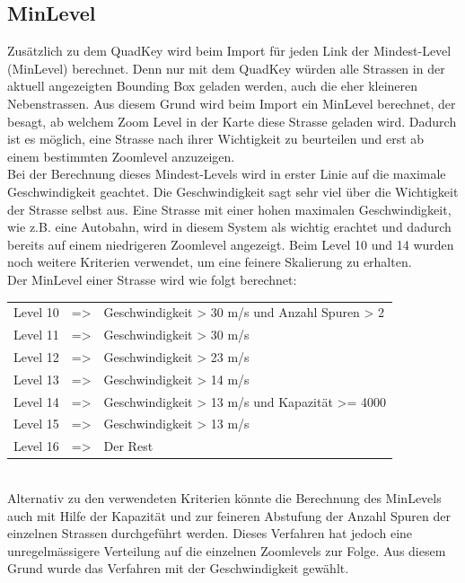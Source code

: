 \subsection{MinLevel}
Zusätzlich zu dem QuadKey wird beim Import für jeden Link der Mindest-Level (MinLevel) berechnet. Denn nur mit dem QuadKey würden alle Strassen in der aktuell angezeigten Bounding Box geladen werden, auch die eher kleineren Nebenstrassen. Aus diesem Grund wird beim Import ein MinLevel berechnet, der besagt, ab welchem Zoom Level in der Karte diese Strasse geladen wird. Dadurch ist es möglich, eine Strasse nach ihrer Wichtigkeit zu beurteilen und erst ab einem bestimmten Zoomlevel anzuzeigen.\\
Bei der Berechnung dieses Mindest-Levels wird in erster Linie auf die maximale  Geschwindigkeit geachtet. Die Geschwindigkeit sagt sehr viel über die Wichtigkeit der Strasse selbst aus. Eine Strasse mit einer hohen maximalen Geschwindigkeit, wie z.B. eine Autobahn, wird in diesem System als wichtig erachtet und dadurch bereits auf einem niedrigeren Zoomlevel angezeigt. Beim Level 10 und 14 wurden noch weitere Kriterien verwendet, um eine feinere Skalierung zu erhalten.\\
Der MinLevel einer Strasse wird wie folgt berechnet:\\[0.3cm]
\begin{tabular}{l c l} 
Level 10 & => & Geschwindigkeit > 30 m/s und Anzahl Spuren > 2 \\ 
Level 11 & => & Geschwindigkeit > 30 m/s  \\ 
Level 12 & => & Geschwindigkeit > 23 m/s \\ 
Level 13 & => & Geschwindigkeit > 14 m/s \\ 
Level 14 & => & Geschwindigkeit > 13 m/s und Kapazität >= 4000  \\ 
Level 15 & => & Geschwindigkeit > 13 m/s \\ 
Level 16 & => & Der Rest \\ 
\end{tabular}\\[0.4cm]
Alternativ zu den verwendeten Kriterien könnte die Berechnung des MinLevels auch mit Hilfe der Kapazität und zur feineren Abstufung der Anzahl Spuren der einzelnen Strassen durchgeführt werden. Dieses Verfahren hat jedoch eine unregelmässigere Verteilung auf die einzelnen Zoomlevels zur Folge. Aus diesem Grund wurde das Verfahren mit der Geschwindigkeit gewählt.
\newpage

